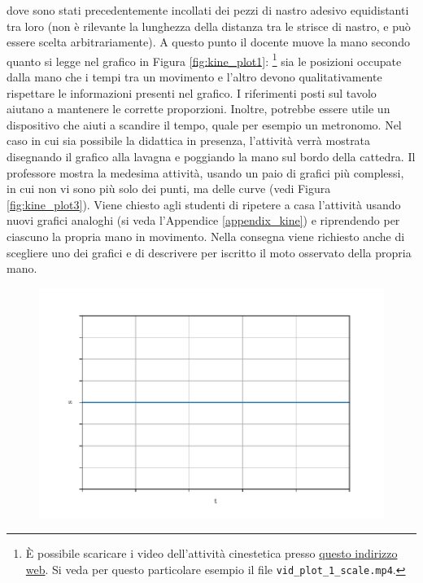 \documentclass{report} \usepackage[T1]{fontenc} \usepackage[italian]{babel}
\begin{document}
dove sono stati precedentemente incollati dei pezzi di nastro adesivo
equidistanti tra loro (non è rilevante la lunghezza della distanza
tra le strisce di nastro, e può essere scelta arbitrariamente). A questo
punto il docente muove la mano secondo quanto
si legge nel grafico in Figura \ref{fig:kine_plot1}:
\footnote{\`E possibile scaricare i video dell'attività cinestetica presso
            \textcolor{blue}{\href{https://github.com/savaroskij/PED1/tree/master/progetto_finale/media/video/kine_videos_1}{questo indirizzo web}}.
            Si veda per questo particolare esempio il file \texttt{vid\_plot\_1\_scale.mp4}.
         }
sia le posizioni occupate dalla
mano che i tempi tra un movimento e l’altro devono qualitativamente
rispettare le informazioni presenti nel grafico. I riferimenti posti sul tavolo
aiutano a mantenere le corrette proporzioni. Inoltre, potrebbe essere utile un
dispositivo che aiuti a scandire il tempo, quale per esempio un metronomo. Nel
caso in cui sia possibile la didattica in presenza, l’attività verrà mostrata
disegnando il grafico alla lavagna e poggiando la mano sul bordo della
cattedra. Il professore mostra la medesima attività, usando un paio di grafici
più complessi, in cui non vi sono più solo dei punti, ma delle curve (vedi Figura
\ref{fig:kine_plot3}).
Viene chiesto agli studenti di ripetere a casa l’attività usando
nuovi grafici analoghi (si veda l'Appendice \ref{appendix_kine}) e riprendendo
per ciascuno la propria mano in movimento.
Nella consegna viene richiesto anche
di scegliere uno dei grafici e di descrivere per iscritto il moto osservato della
propria mano.

\begin{figure}[H]
\centering
  \includegraphics[width=\textwidth]{kine_plot2}
  \label{fig:kine_plot2}
\end{figure}
\end{document}
